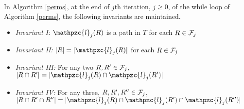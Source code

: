 \documentclass{llncs}
\def\cF{{\cal F}}
\def\cl{\mathpzc{l}}
\begin{document}
\begin{lemma}
\label{lem:invar1}
  In Algorithm \ref{perms}, at the end of $j$th iteration, $j \ge 0$, of the while loop of 
  Algorithm \ref{perms}, the following invariants are maintained.
\begin{itemize}
\item {\em Invariant I:} $\cl_j(R)$ is a path in $T$ for each $R \in \cF_j$
\item {\em Invariant II:} $|R| = |\cl_j(R)|$ for each $R \in \cF_j$
\item {\em Invariant III:} For any two $R, R' \in \cF_j$,
  $|R \cap R'| = |\cl_j(R) \cap \cl_j(R')|$
\item {\em Invariant IV:} For any three, $R, R', R'' \in \cF_j$,
  $|R \cap R' \cap R''|=|\cl_j(R) \cap \cl_j(R') \cap \cl_j(R'')|$
\end{itemize}
\end{lemma}
\end{document}
